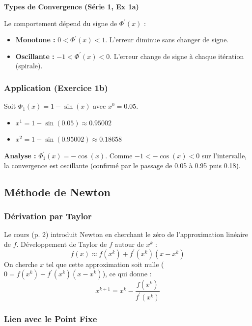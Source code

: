 \textbf{Types de Convergence (Série 1, Ex 1a)} 

Le comportement dépend du signe de $\Phi^{\prime}(x)$ : 
\begin{itemize}
    \item \textbf{Monotone :} $0<\Phi^{\prime}(x)<1$. L'erreur diminue sans changer de signe.
    \item \textbf{Oscillante :} $-1<\Phi^{\prime}(x)<0$. L'erreur change de signe à chaque itération (spirale).
\end{itemize}

\subsubsection*{Application (Exercice 1b)} 

Soit $\Phi_{1}(x)=1-\sin(x)$ avec $x^{0}=0.05$.
\begin{itemize}
    \item $x^{1}=1-\sin(0.05)\approx0.95002$ 
    \item $x^{2}=1-\sin(0.95002)\approx0.18658$ 
\end{itemize}

\textbf{Analyse :} $\Phi_{1}^{\prime}(x)=-\cos(x)$. Comme $-1<-\cos(x)<0$ sur l'intervalle, la convergence est oscillante (confirmé par le passage de 0.05 à 0.95 puis 0.18).

\subsection{Méthode de Newton} 

\subsubsection*{Dérivation par Taylor} 

Le cours (p. 2) introduit Newton en cherchant le zéro de l'approximation linéaire de $f$. Développement de Taylor de $f$ autour de $x^{k}$ : 
\begin{equation*}
    f(x)\approx f(x^{k})+f^{\prime}(x^{k})(x-x^{k}) 
\end{equation*}
On cherche $x$ tel que cette approximation soit nulle ($0=f(x^{k})+f^{\prime}(x^{k})(x-x^{k})$), ce qui donne : 
\begin{equation*}
    x^{k+1}=x^{k}-\frac{f(x^{k})}{f^{\prime}(x^{k})} 
\end{equation*}

\subsubsection*{Lien avec le Point Fixe} 

